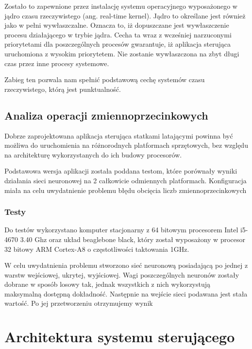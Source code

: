 Zostało to zapewnione przez instalację systemu operacyjnego wyposażonego w jądro czasu rzeczywistego (ang. real-time kernel). Jądro to określane jest również jako w pełni wywłaszczalne. Oznacza to, iż dopuszczane jest wywłaszczenie procesu działającego w trybie jądra. Cecha ta wraz z wcześniej narzuconymi priorytetami dla poszczególnych procesów gwarantuje, iż aplikacja sterująca uruchomiona z wysokim priorytetem. Nie zostanie wywłaszczona na zbyt długi czas przez inne procesy systemowe. 

Zabieg ten pozwala nam spełnić podstawową cechę systemów czasu rzeczywistego, którą jest punktualność.


\subsection{Analiza operacji zmiennoprzecinkowych}
Dobrze zaprojektowana aplikacja sterująca statkami latającymi powinna być możliwa do uruchomienia na różnorodnych platformach sprzętowych, bez względu na architekturę wykorzystanych do ich budowy procesorów.

Podstawowa wersja aplikacji została poddana testom, które porównały wyniki działania sieci neuronowej na 2 całkowicie odmiennych platformach. Konfiguracja miała na celu uwydatnienie problemu błędu obcięcia liczb zmiennoprzecinkowych 

\subsubsection{Testy}
Do testów wykorzystano komputer stacjonarny z 64 bitowym procesorem Intel i5-4670 3.40 Ghz oraz układ beaglebone black, który został wyposażony w procesor 32 bitowy ARM Cortex-A8 o częstotliwości taktowania 1GHz.

W celu uwydatnienia problemu stworzono sieć neuronową posiadającą po jednej z warstw wejściowej, ukrytej, wyjściowej. Wagi poszczególnych neuronów zostały dobrane w sposób losowy tak, jednak wszystkich z nich wykorzystują maksymalną dostępną dokładność. Następnie na wejście sieci podawana jest stała wartość. Po jej przetworzeniu otrzymujemy wynik  


\section{Architektura systemu sterującego}
